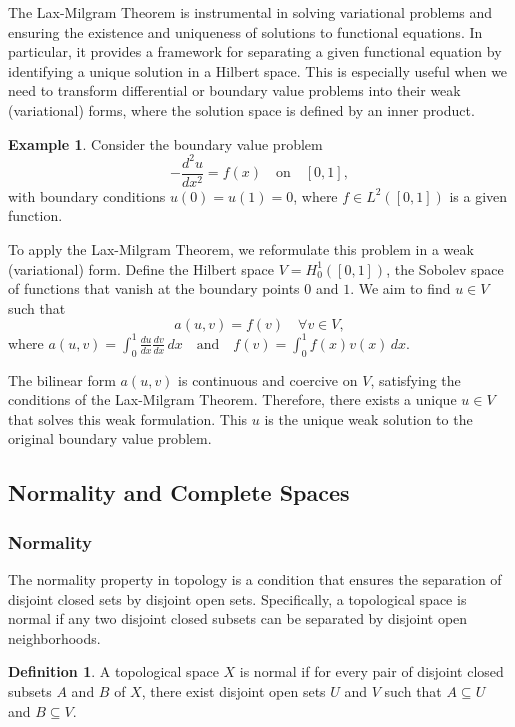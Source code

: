 \documentclass[12pt, reqno]{amsart}
\theoremstyle{definition}
\newtheorem{definition}[theorem]{Definition}
\newtheorem{example}[theorem]{Example}
\numberwithin{equation}{section}
\begin{document}
The Lax-Milgram Theorem is instrumental in solving variational problems and ensuring the existence and uniqueness of solutions to functional equations. In particular, it provides a framework for separating a given functional equation by identifying a unique solution in a Hilbert space. This is especially useful when we need to transform differential or boundary value problems into their weak (variational) forms, where the solution space is defined by an inner product.

\begin{example}
Consider the boundary value problem
\[
-\frac{d^2 u}{dx^2} = f(x) \quad \text{on} \quad [0, 1],
\]
with boundary conditions \( u(0) = u(1) = 0 \), where \( f \in L^2([0, 1]) \) is a given function.

To apply the Lax-Milgram Theorem, we reformulate this problem in a weak (variational) form. Define the Hilbert space \( V = H_0^1([0, 1]) \), the Sobolev space of functions that vanish at the boundary points \( 0 \) and \( 1 \). We aim to find \( u \in V \) such that
\[
a(u, v) = f(v) \quad \forall v \in V,
\]
where
$
a(u, v) = \int_0^1 \frac{du}{dx} \frac{dv}{dx} \, dx \quad \text{and} \quad f(v) = \int_0^1 f(x) v(x) \, dx.
$

The bilinear form \( a(u, v) \) is continuous and coercive on \( V \), satisfying the conditions of the Lax-Milgram Theorem. Therefore, there exists a unique \( u \in V \) that solves this weak formulation. This \( u \) is the unique weak solution to the original boundary value problem.
\end{example}


\subsection{Normality and Complete Spaces}
\subsubsection{Normality}
The normality property in topology is a condition that ensures the separation of disjoint closed sets by disjoint open sets. Specifically, a topological space is normal if any two disjoint closed subsets can be separated by disjoint open neighborhoods.
\begin{definition}
    A topological space $X$ is normal if for every pair of disjoint closed subsets $A$ and $B$ of $X$, there exist disjoint open sets $U$ and $V$ such that $A \subseteq U$ and $B \subseteq V$.
\end{definition}
\end{document}
